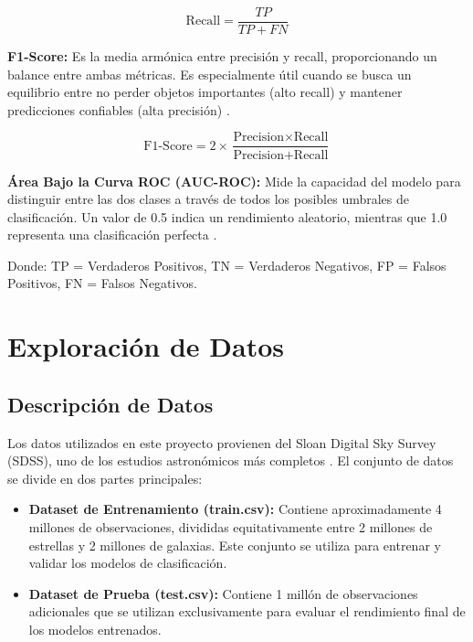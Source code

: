 \documentclass{article}
\begin{document}
\begin{equation}
\text{Recall} = \frac{TP}{TP + FN}
\end{equation}

\textbf{F1-Score:} Es la media armónica entre precisión y recall, proporcionando un balance entre ambas métricas. Es especialmente útil cuando se busca un equilibrio entre no perder objetos importantes (alto recall) y mantener predicciones confiables (alta precisión) \cite{fscore_metric}.

\begin{equation}
\text{F1-Score} = 2 \times \frac{\text{Precision} \times \text{Recall}}{\text{Precision} + \text{Recall}}
\end{equation}

\textbf{Área Bajo la Curva ROC (AUC-ROC):} Mide la capacidad del modelo para distinguir entre las dos clases a través de todos los posibles umbrales de clasificación. Un valor de 0.5 indica un rendimiento aleatorio, mientras que 1.0 representa una clasificación perfecta \cite{roc_metric}.

Donde: TP = Verdaderos Positivos, TN = Verdaderos Negativos, FP = Falsos Positivos, FN = Falsos Negativos.

\section{Exploración de Datos}

\subsection{Descripción de Datos}

Los datos utilizados en este proyecto provienen del Sloan Digital Sky Survey (SDSS), uno de los estudios astronómicos más completos \cite{kaggle_dataset}. El conjunto de datos se divide en dos partes principales:

\begin{itemize}
    \item \textbf{Dataset de Entrenamiento (train.csv):} Contiene aproximadamente 4 millones de observaciones, divididas equitativamente entre 2 millones de estrellas y 2 millones de galaxias. Este conjunto se utiliza para entrenar y validar los modelos de clasificación.
    \item \textbf{Dataset de Prueba (test.csv):} Contiene 1 millón de observaciones adicionales que se utilizan exclusivamente para evaluar el rendimiento final de los modelos entrenados.
\end{itemize}
\end{document}

